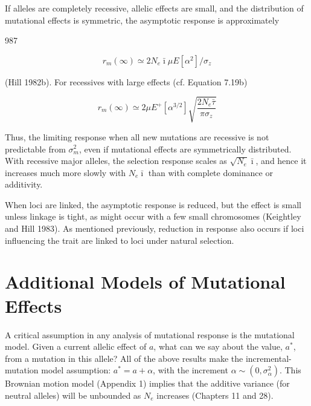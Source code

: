 \documentclass{article}
\begin{document}
{If alleles are completely recessive, allelic effects are small, and the distribution of mutational effects is symmetric, the asymptotic response is approximately

987

\begin{equation}
r_{m}(\infty)\simeq2N_{e}\bar{\imath}\mu E\left[\alpha^{2}\right]/\sigma_{z}
\tag{26.36a}
\label{eq:26_36a}
\end{equation}

(Hill 1982b). For recessives with large effects (cf. Equation 7.19b)

\begin{equation}
r_{m}(\infty)\simeq2\mu E^{+}\left[\alpha^{3/2}\right]\sqrt{\frac{2N_{e}\bar{\tau}}{\pi\sigma_{z}}}
\tag{26.36b}
\label{eq:26_36b}
\end{equation}

Thus, the limiting response when all new mutations are recessive is not predictable from  $ \sigma_m^2 $, even if mutational effects are symmetrically distributed. With recessive major alleles, the selection response scales as  $ \sqrt{N_e} \bar{\imath} $, and hence it increases much more slowly with  $ N_e \bar{\imath} $ than with complete dominance or additivity.

When loci are linked, the asymptotic response is reduced, but the effect is small unless linkage is tight, as might occur with a few small chromosomes (Keightley and Hill 1983). As mentioned previously, reduction in response also occurs if loci influencing the trait are linked to loci under natural selection.

\section{Additional Models of Mutational Effects}
A critical assumption in any analysis of mutational response is the mutational model. Given a current allelic effect of $a$, what can we say about the value, $a^{*}$, from a mutation in this allele? All of the above results make the incremental-mutation model assumption: $a^{*}=a+\alpha$, with the increment $\alpha\sim(0,\sigma_{\alpha}^{2})$. This Brownian motion model (Appendix 1) implies that the additive variance (for neutral alleles) will be unbounded as $N_{e}$ increases (Chapters 11 and 28).

}
\end{document}
